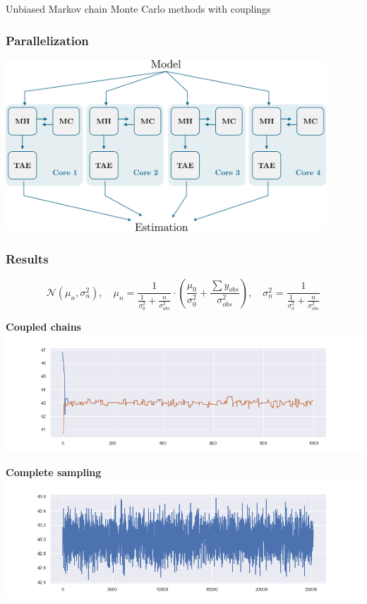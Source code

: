\documentclass{beamer}
\begin{document}
\begin{section}{Unbiased Markov chain Monte Carlo methods with couplings}
	\begin{frame}
		\frametitle{Parallelization}
		\begin{center}
			\includegraphics[width=0.9\textwidth]{img/Bayes2}
		\end{center}
	\end{frame}


	\begin{frame}
		\frametitle{Results}
		
		{\small
			$$
				\mathcal{N}(\mu_n, \sigma^2_n), 
				\quad
				\mu_n 
					= \frac{1}{ \frac{1}{\sigma_0^2} + \frac{n}{\sigma_{obs}^2} } 
					\cdot \left(\frac{\mu_0}{\sigma_0^2} + \frac{\sum y_{obs}}{\sigma_{obs}^2}\right),
				\quad
				\sigma^2_n
					= \frac{1}{ \frac{1}{\sigma_0^2} + \frac{n}{\sigma_{obs}^2} } 
		$$
		}
	
		\begin{minipage}{0.48\textwidth}
			\begin{center}
				{\scriptsize \textbf{Coupled chains} }
				\includegraphics[width=\textwidth]{img/mcmc_coupling_chain_meeting}
			\end{center}
		\end{minipage}
		\hfill
		\begin{minipage}{0.48\textwidth}
			\begin{center}
				{\scriptsize \textbf{Complete sampling}}
				\includegraphics[width=\textwidth]{img/mcmc_coupling_sampling}
			\end{center}
		\end{minipage}
	

\end{frame}
\end{section}
\end{document}
